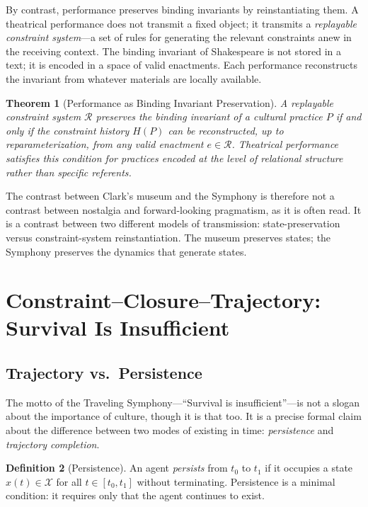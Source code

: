 \documentclass[12pt, oneside]{article}
\theoremstyle{plain}
\newtheorem{theorem}{Theorem}[section]
\theoremstyle{definition}
\newtheorem{definition}[theorem]{Definition}
\theoremstyle{remark}
\begin{document}
By contrast, performance preserves binding invariants by
reinstantiating them. A theatrical performance does not transmit a
fixed object; it transmits a \emph{replayable constraint system}---a
set of rules for generating the relevant constraints anew in the
receiving context. The binding invariant of Shakespeare is not stored
in a text; it is encoded in a space of valid enactments. Each
performance reconstructs the invariant from whatever materials are
locally available.

\begin{theorem}[Performance as Binding Invariant Preservation]
\label{thm:performance-binding}
A replayable constraint system $\mathcal{R}$ preserves the binding
invariant of a cultural practice $P$ if and only if the constraint
history $H(P)$ can be reconstructed, up to reparameterization, from
any valid enactment $e \in \mathcal{R}$. Theatrical performance
satisfies this condition for practices encoded at the level of
relational structure rather than specific referents.
\end{theorem}

The contrast between Clark's museum and the Symphony is therefore
not a contrast between nostalgia and forward-looking pragmatism, as
it is often read. It is a contrast between two different models of
transmission: state-preservation versus constraint-system
reinstantiation. The museum preserves states; the Symphony preserves
the dynamics that generate states.

\section{Constraint--Closure--Trajectory: Survival Is Insufficient}

\subsection{Trajectory vs.\ Persistence}

The motto of the Traveling Symphony---``Survival is insufficient''---is
not a slogan about the importance of culture, though it is that too.
It is a precise formal claim about the difference between two modes
of existing in time: \emph{persistence} and \emph{trajectory
completion}.

\begin{definition}[Persistence]
An agent \emph{persists} from $t_0$ to $t_1$ if it occupies a state
$x(t) \in \mathcal{X}$ for all $t \in [t_0, t_1]$ without
terminating. Persistence is a minimal condition: it requires only
that the agent continues to exist.
\end{definition}
\end{document}
